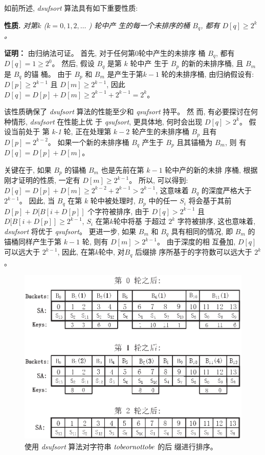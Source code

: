 如前所述, \emph{dsufsort} 算法具有如下重要性质:


\textbf{性质.} \emph{对第$k$ \emph{(}$k = 0,1,2,\dots$ \emph{)} 轮中产
  生的每一个未排序的桶 $B_q$, 都有 $D[q] \geq 2^k$。}


\textbf{证明：} 由归纳法可证。 首先, 对于任何第0轮中产生的未排序
桶 $B_q$, 都有 $D[q] = 1 \geq 2^0$。  然后, 假设 $B_q$ 是第 $k$ 轮中产
生于 $B_p$ 的新的未排序桶, 且 $B_m$ 是 $B_q$ 的锚
桶。 由于 $B_p$ 和 $B_m$ 是产生于第$k-1$ 轮的未排序桶, 由归纳假设有:
$D[p] \geq 2^{k-1}$ 且 $D[m] \geq 2^{k-1}$, 因此
$D[q] = D[p] + D[m] \geq 2^{k-1} + 2^{k-1} = 2^k$。


该性质确保了 \emph{dsufsort} 算法的性能至少和 \emph{qsufsort} 持平。 然
而, 有必要探讨在何种情形, \emph{dsufsort} 在性能上优
于 \emph{qsufsort}, 更具体地, 何时会出现 $D[q] > 2^k$。 假设当前处于
第 \emph{k-1} 轮, 正在处理第 $k-2$ 轮产生的未排序桶 $B_p$ 且有 $D[p] =
2^{k-2}$。 如果一个新的未排序桶 $B_q$ 产生于 $B_p$ 且其锚桶为 $B_m$, 则
有 $D[q] = D[p] + D[m]$。

关键在于, 如果 $B_p$ 的锚桶 $B_m$ 也是先前在第 $k-1$ 轮中产的新的未排
序桶, 根据刚才证明的性质, 一定有 $D[m] \geq 2^{k-1}$。 所以, 可以得到:
$D[q] = D[p] + D[m] \geq 2^{k-2} + 2^{k-1} > 2^{k-1}$, 这意味着 $B_q$
的深度严格大于 $2^{k-1}$。 因此, 当 $B_q$ 在第 $k$ 轮中被处理时, $B_p$
中的任一 $S_i$ 将会基于其前 $D[p] + D[B[i+D[p]]$ 个字符被排序, 由于
$D[q] > 2^{k-1}$ 且 $D[B[i+D[p]] \geq 2^{k-1}$, $S_i$ 在第$k$轮中将基
于超过 $2^k$ 字符被排序, 这也意味着, \emph{dsufsort} 将优于
\emph{qsufsort}。 更进一步, 如果 $B_m$ 和 $B_q$ 具有相同的情况, 即
$B_m$ 的锚桶同样产生于第 $k-1$ 轮, 则有 $D[m] > 2^{k-1}$。 由于深度的相
互叠加, $D[q]$ 可以远大于 $2^{k-1}$, 因此, 在第$k$轮中, 对$B_q$ 后缀排
序所基于的字符数可以远大于 $2^k$。

\begin{figure}[H]
\centering
\includegraphics[height=8.5cm ,width=12.5cm]{figures/3_SS/dsufsort}
\vspace*{8pt}
\caption{使用 \emph{dsufsort} 算法对字符串 $\emph{tobeornottobe}$ 的后
  缀进行排序。}
\label{fig:1}
\end{figure}

